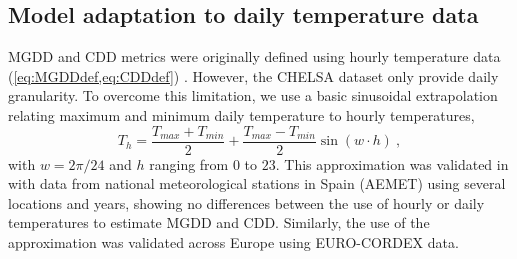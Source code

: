 \subsection{Model adaptation to daily temperature data}

MGDD and CDD metrics were originally defined using hourly temperature data
(\cref{eq:MGDDdef,eq:CDDdef}) \cite{GimenezRomero2022_CommsBio}. However, the
CHELSA
dataset only provide daily granularity. To overcome this limitation, we use a
basic sinusoidal extrapolation relating maximum and minimum daily temperature
to hourly temperatures,
\begin{equation}
    T_h=\frac{T_{max}+T_{min}}{2} + \frac{T_{max}-T_{min}}{2}\sin(w\cdot h)
    \ ,
\end{equation}
with $w=2\pi/24$ and $h$ ranging from $0$ to $23$. This approximation was
validated in \cite{GimenezRomero2023_PD} with data from national meteorological
stations
in Spain (AEMET) using several locations and years, showing no differences
between the use of hourly or daily temperatures to estimate MGDD and CDD.
Similarly, the use of the approximation was validated across Europe using
EURO-CORDEX data.
